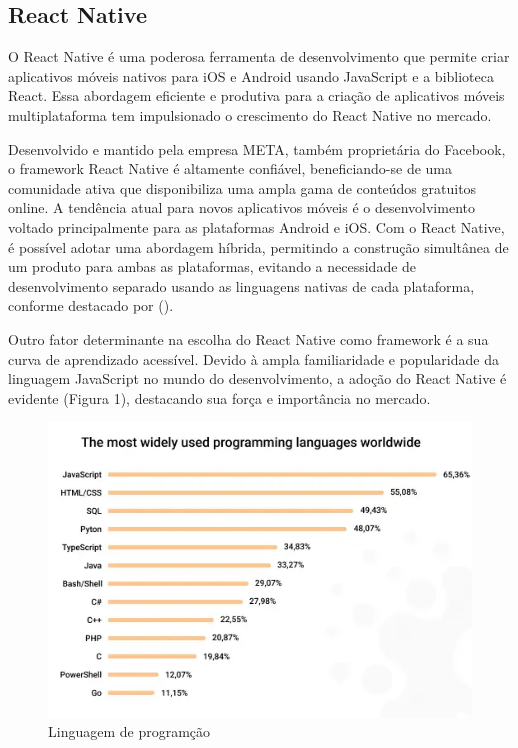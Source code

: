 \subsection{React Native}
O React Native é uma poderosa ferramenta de desenvolvimento que permite criar aplicativos móveis nativos para iOS e Android usando JavaScript e a biblioteca React. Essa abordagem eficiente e produtiva para a criação de aplicativos móveis multiplataforma tem impulsionado o crescimento do React Native no mercado.

Desenvolvido e mantido pela empresa META, também proprietária do Facebook, o framework React Native é altamente confiável, beneficiando-se de uma comunidade ativa 
que disponibiliza uma ampla gama de conteúdos gratuitos online. A tendência atual para novos aplicativos móveis é o desenvolvimento voltado principalmente para as 
plataformas Android e iOS. Com o React Native, é possível adotar uma abordagem híbrida, permitindo a construção simultânea de um produto para ambas as plataformas, 
evitando a necessidade de desenvolvimento separado usando as linguagens nativas de cada plataforma, conforme destacado por (\textcite{Sabino}).

Outro fator determinante na escolha do React Native como framework é a sua curva de aprendizado acessível. Devido à ampla familiaridade e popularidade da linguagem 
JavaScript no mundo do desenvolvimento, a adoção do React Native é evidente (Figura 1), destacando sua força e importância no mercado.
\begin{figure}[htb]
	\caption{\label{fig:Fig_1}Linguagem de programção}
	\begin{center}
		\includegraphics{images/top.png}
	\end{center}
\end{figure}

